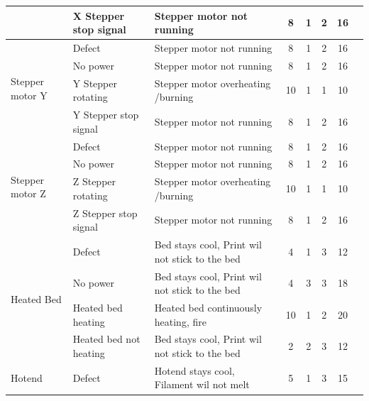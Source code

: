 \documentclass{article}
\begin{document}
\begin{landscape}
\begin{longtable}{|l|l|l|c|c|c|c|l|}
                                            & X Stepper stop signal & Stepper motor not running             & 8 & 1 & 2 & 16 & \\ 
                                            \hline 
        \multirow{4}{*}{Stepper motor Y}    & Defect                & Stepper motor not running             & 8 & 1 & 2 & 16 & \\
                                            & No power              & Stepper motor not running             & 8 & 1 & 2 & 16 & \\
                                            & Y Stepper rotating    & Stepper motor overheating /burning    & 10 & 1 & 1 & 10 & \\
                                            & Y Stepper stop signal & Stepper motor not running             & 8 & 1 & 2 & 16 & \\ 
                                            \hline
        \multirow{4}{*}{Stepper motor Z}    & Defect                & Stepper motor not running             & 8 & 1 & 2 & 16 & \\
                                            & No power              & Stepper motor not running             & 8 & 1 & 2 & 16 & \\
                                            & Z Stepper rotating    & Stepper motor overheating /burning    & 10 & 1 & 1 & 10 & \\
                                            & Z Stepper stop signal & Stepper motor not running             & 8 & 1 & 2 & 16 & \\ 
                                            \hline 
        \multirow{4}{*}{Heated Bed}         & Defect                    & Bed stays cool, Print wil not stick to the bed    & 4 & 1 & 3 & 12 & \\
                                            & No power                  & Bed stays cool, Print wil not stick to the bed    & 4 & 3 & 3 & 18 & \\
                                            & Heated bed heating        & Heated bed continuously heating, fire             & 10 & 1 & 2 & 20 & \\
                                            & Heated bed not heating    & Bed stays cool, Print wil not stick to the bed    & 2 & 2 & 3 & 12 & \\ 
                                            \hline 
        \multirow{4}{*}{Hotend}             & Defect                    & Hotend stays cool, Filament wil not melt          & 5 & 1 & 3 & 15 & \\

\end{longtable}
\end{landscape}
\end{document}
